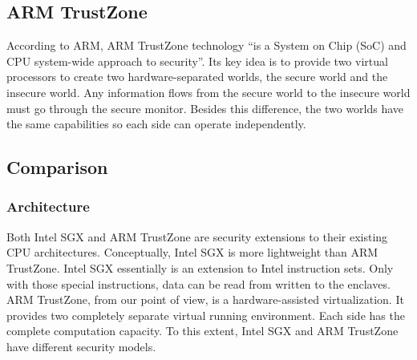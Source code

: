 \subsection{ARM TrustZone}
According to ARM, ARM TrustZone technology ``is a System on
Chip (SoC) and CPU system-wide approach to security''. Its key
idea is to provide two virtual processors to create two 
hardware-separated worlds, the secure world and the insecure
world. Any information flows from the secure world to the 
insecure world must go through the secure monitor. Besides 
this difference, the two worlds have the same capabilities so
each side can operate independently.   

\subsection{Comparison}
\subsubsection{Architecture}
Both Intel SGX and ARM TrustZone are security extensions to 
their existing CPU architectures. Conceptually, Intel SGX
is more lightweight than ARM TrustZone.
Intel SGX essentially is an 
extension to Intel instruction sets. Only with those special 
instructions, data can be read from written to the enclaves.
ARM TrustZone, from our point of view, is a hardware-assisted
virtualization. It provides two completely separate virtual 
running environment. Each side has the complete computation 
capacity. To this extent, Intel SGX and ARM TrustZone have 
different security models.    



